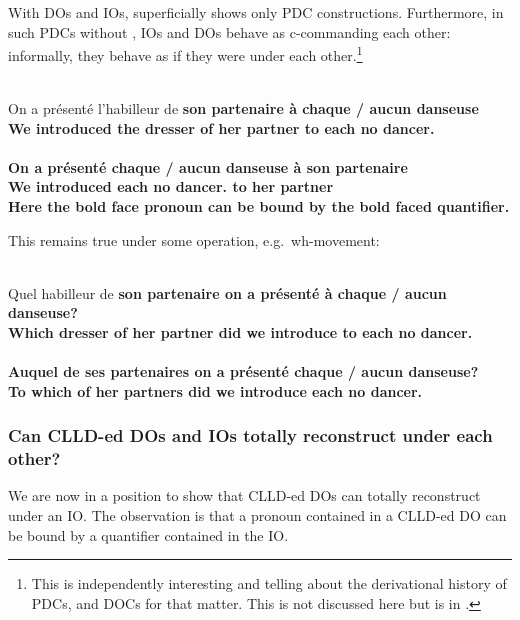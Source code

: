 \documentclass[output=paper]{langsci/langscibook}
\begin{document}
With \glspl{DO} and \glspl{IO},  superficially shows only
\gls{PDC} constructions.  Furthermore, in
such \glspl{PDC} without  , IOs and DOs behave as c-commanding
each other: informally, they behave as if they were under each
other.\footnote{This is independently interesting and telling about the
    derivational history of \glspl{PDC}, and \glspl{DOC} for that matter. This is  not discussed here but is in
\textcite{Sportiche2017}.}

\ea \label{doio1}
\\
\gll On a  pr\'{e}sent\'{e} l'habilleur de \bf{son} partenaire \`{a} \textbf{chaque} / \textbf{aucun} danseuse\\
We {} introduced {the dresser} of her partner to each {} no dancer.\glossF{} \\
\\
\gll On a  pr\'{e}sent\'{e} \textbf{chaque} / \textbf{aucun} danseuse \`{a} \bf{son} partenaire\\
We {} introduced each {} no dancer.\glossF{} to her partner\\
\z
\z
%
Here the bold face pronoun can be bound by the bold faced quantifier.

This remains true under some  operation, e.g.\ wh-movement:

\ea \label{doio2}
\\
\gll Quel habilleur de \bf{son} partenaire on a  pr\'{e}sent\'{e}  \`{a} \textbf{chaque} / \textbf{aucun} danseuse?\\
  Which dresser of her {partner did} we {} introduce to each {} no dancer.\glossF{} \\
\\
\gll  Auquel de  \bf{ses} partenaires on a  pr\'{e}sent\'{e} \textbf{chaque} / \textbf{aucun} danseuse?\\
{To which} of her {partners did} we {} introduce each {} no dancer.\glossF{} \\
\z
\z

\subsubsection{Can CLLD-ed DOs and IOs totally reconstruct
under each other?}\label{frozenscope}

We are now in a position to show that \gls{CLLD}-ed \glspl{DO} can totally
reconstruct under an  IO. The observation is that a pronoun contained in a
\gls{CLLD}-ed \gls{DO} can be bound by a quantifier contained in the \gls{IO}.
\end{document}
